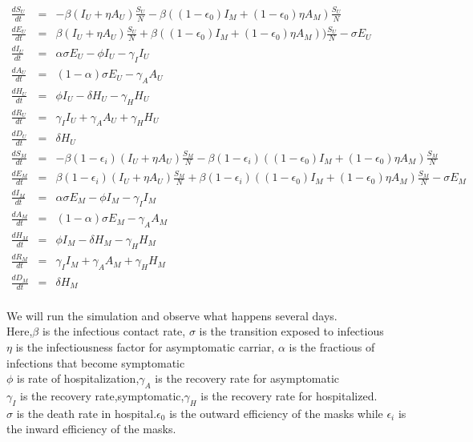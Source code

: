\documentclass{article}
\begin{document}
\begin{minipage}{0.35\textwidth}
\tiny
\begin{eqnarray}
  \frac{dS_{U}}{dt} &=& -\beta(I_{U}+\eta A_{U})\frac{S_{U}}{N}-\beta((1-\epsilon_{0})I_{M}+(1-\epsilon_{0})\eta A_{M})\frac{S_{U}}{N}\nonumber\\
  \frac{dE_{U}}{dt} &=& \beta(I_{U}+\eta{A}_{U})\frac{S_{U}}{N}+\beta((1-\epsilon_{0})I_{M}+(1-\epsilon_{0})\eta A_{M}))\frac{S_{U}}{N}-\sigma E_{U}\nonumber\\
  \frac{dI_{U}}{dt} &=& \alpha\sigma E_{U}-\phi I_{U}-\gamma_{I}I_{U}\nonumber\\
  \frac{dA_{U}}{dt} &=& (1-\alpha)\sigma E_{U}-\gamma_{A}A_{U}\nonumber\\
  \frac{dH_{U}}{dt} &=& \phi I_{U}-\delta H_{U}-\gamma_{H}H_{U}\nonumber\\
  \frac{dR_{U}}{dt} &=& \gamma_{I}I_{U}+\gamma_{A}A_{U}+\gamma_{H}H_{U}\nonumber\\
  \frac{dD_{U}}{dt} &=& \delta H_{U}\nonumber\\
  \frac{dS_{M}}{dt} &=& -\beta(1-\epsilon_{i})(I_{U}+\eta A_{U})\frac{S_{M}}{N}-\beta(1-\epsilon_{i})((1-\epsilon_{0})I_{M}+(1-\epsilon_{0})\eta A_{M})\frac{S_{M}}{N}\nonumber\\
  \frac{dE_{M}}{dt} &=& \beta(1-\epsilon_{i})(I_{U}+\eta A_{U})\frac{S_{M}}{N}+\beta(1-\epsilon_{i})((1-\epsilon_{0})I_{M}+(1-\epsilon_{0})\eta A_{M})\frac{S_{M}}{N}-\sigma E_{M} \nonumber\\
  \frac{dI_{M}}{dt} &=& \alpha\sigma E_{M} - \phi I_{M}-\gamma_{I} I_{M}\nonumber\\
  \frac{dA_{M}}{dt} &=& (1-\alpha)\sigma E_{M}-\gamma_{A}A_{M}\nonumber\\
  \frac{dH_{M}}{dt} &=& \phi I_{M}-\delta H_{M}-\gamma_{H}H_{M}\nonumber\\
  \frac{dR_{M}}{dt} &=& \gamma_{I}I_{M} +\gamma_{A}A_{M}+\gamma_{H}H_{M}\nonumber\\
  \frac{dD_{M}}{dt} &=& \delta H_{M}\nonumber\\
\end{eqnarray}
\end{minipage}

We will run the simulation and observe what happens several days. \\Here,$\beta$ is the infectious contact rate, $\sigma$ is the transition exposed to infectious\\$\eta$ is the infectiousness factor for asymptomatic carriar, $\alpha$ is the fractious of infections that become symptomatic\\
$\phi$ is rate of hospitalization,$\gamma_{A}$ is the recovery rate for asymptomatic
\\$\gamma_{I}$ is the recovery rate,symptomatic,$\gamma_{H}$ is the recovery rate for hospitalized.\\$\sigma$ is the death rate in hospital.$\epsilon_{0}$ is the outward efficiency of the masks while $\epsilon_{i}$ is the inward efficiency of the masks.\\
\end{document}
